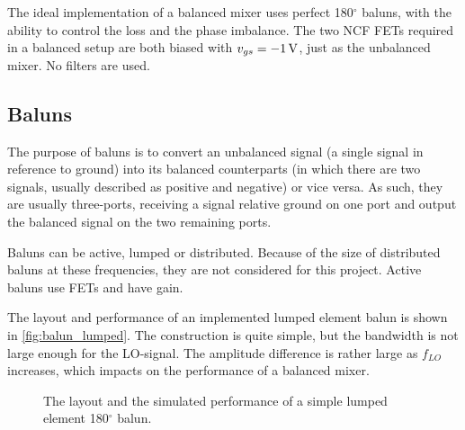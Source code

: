 			The ideal implementation of a balanced mixer uses perfect 180$^\circ$ baluns, with the ability to control the loss and the phase imbalance. The two NCF FETs required in a balanced setup are both biased with $v_{gs}=\unit[-1]{V}$, just as the unbalanced mixer. No filters are used.

		\subsection{Baluns}
			The purpose of baluns is to convert an unbalanced signal (a single signal in reference to ground) into its balanced counterparts (in which there are two signals, usually described as positive and negative) or vice versa. As such, they are usually three-ports, receiving a signal relative ground on one port and output the balanced signal on the two remaining ports.
	
			Baluns can be active, lumped or distributed. Because of the size of distributed baluns at these frequencies, they are not considered for this project. Active baluns use FETs and have gain.
	
			The layout and performance of an implemented lumped element balun is shown in \autoref{fig:balun_lumped}.\autocite{kuylenstierna04} The construction is quite simple, but the bandwidth is not large enough for the LO-signal. The amplitude difference is rather large as $f_{LO}$ increases, which impacts on the performance of a balanced mixer.
	
			\begin{figure}[hpt!]
				\centering 
				\caption{ The layout and  the simulated performance of a simple lumped element 180$^\circ$ balun.}\label{fig:balun_lumped}
			\end{figure}
%			

